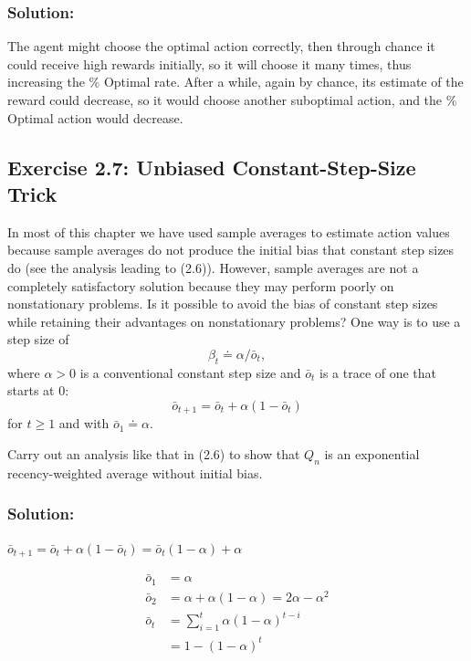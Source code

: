 \subsubsection*{Solution:}

The agent might choose the optimal action correctly, then through chance it could receive high rewards initially, so it will choose it many times, thus increasing the \% Optimal rate. After a while, again by chance, its estimate of the reward could decrease, so it would choose another suboptimal action, and the \% Optimal action would decrease. 


\subsection*{Exercise 2.7: Unbiased Constant-Step-Size Trick} 
In most of this chapter we have used
sample averages to estimate action values because sample averages do not produce the
initial bias that constant step sizes do (see the analysis leading to (2.6)). However, sample
averages are not a completely satisfactory solution because they may perform poorly
on nonstationary problems. Is it possible to avoid the bias of constant step sizes while
retaining their advantages on nonstationary problems? One way is to use a step size of
\begin{equation}
    \beta_t \doteq \alpha / \bar{o}_t,
\end{equation}
where $\alpha > 0$ is a conventional constant step size and $\bar{o}_t$ is a trace of one that starts at 0:
\begin{equation}
    \bar{o}_{t+1} = \bar{o}_t + \alpha (1 - \bar{o}_t)
\end{equation}
for $t \geq 1$ and with $\bar{o}_1 \doteq \alpha$. 

Carry out an analysis like that in (2.6) to show that $Q_n$ is an exponential recency-weighted average without initial bias.

\subsubsection*{Solution:}


$\bar{o}_{t+1} = \bar{o}_t + \alpha (1 - \bar{o}_t) = \bar{o}_t(1-\alpha) + \alpha $

\begin{equation}
    \begin{aligned}
        \bar{o}_{1} &= \alpha \\
        \bar{o}_{2} &= \alpha + \alpha(1- \alpha) = 2\alpha - \alpha^2 \\
        \bar{o}_{t} &= \sum_{i=1}^{t} \alpha (1-\alpha)^{t-i}\\
        &=1-\left(1-\alpha\right)^{t}\\
    \end{aligned}
\end{equation}

